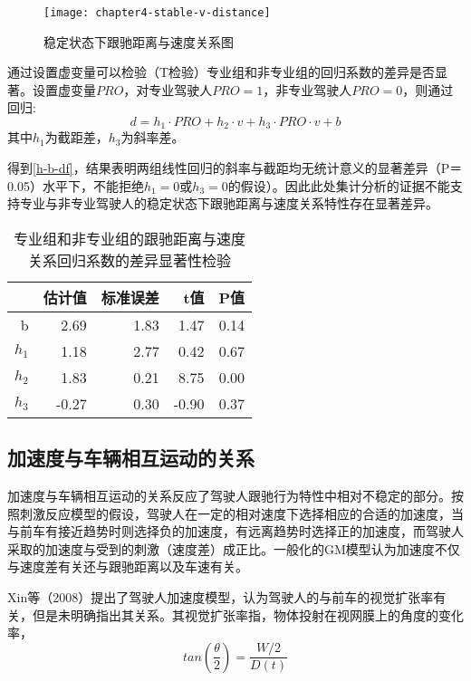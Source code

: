 \begin{figure}[htbp]
\begin{center}
\texttt{[image: chapter4-stable-v-distance]}
\end{center}
\caption{稳定状态下跟驰距离与速度关系图}
\label{stable-v-distance}
\end{figure}

通过设置虚变量可以检验（T检验）专业组和非专业组的回归系数的差异是否显著。设置虚变量$PRO$，对专业驾驶人$PRO=1$，非专业驾驶人$PRO=0$，则通过回归:
\begin{equation}
d=h_1 \cdot PRO+h_2\cdot v + h_3 \cdot PRO \cdot v +b
\end{equation}
其中$h_1$为截距差，$h_3$为斜率差。

得到\autoref{h-b-df}，结果表明两组线性回归的斜率与截距均无统计意义的显著差异（P＝0.05）水平下，不能拒绝$h_1=0$或$h_3=0$的假设）。因此此处集计分析的证据不能支持专业与非专业驾驶人的稳定状态下跟驰距离与速度关系特性存在显著差异。

\begin{table}[htbp]
\begin{center}
\caption{专业组和非专业组的跟驰距离与速度关系回归系数的差异显著性检验}
\begin{tabular}{rrrrr}
  \addlinespace
  \toprule
 & 估计值 & 标准误差 & t值 & P值 \\ 
  \midrule
b & 2.69 & 1.83 & 1.47 & 0.14 \\ 
  $h_1$ & 1.18 & 2.77 & 0.42 & 0.67 \\ 
  $h_2$ & 1.83 & 0.21 & 8.75 & 0.00 \\ 
  $h_3$ & -0.27 & 0.30 & -0.90 & 0.37 \\ 
   \bottomrule
\end{tabular}
\label{h-b-df}
\end{center}
\end{table}


\subsection{加速度与车辆相互运动的关系}
\label{ttc}
加速度与车辆相互运动的关系反应了驾驶人跟驰行为特性中相对不稳定的部分。按照刺激反应模型的假设，驾驶人在一定的相对速度下选择相应的合适的加速度，当与前车有接近趋势时则选择负的加速度，有远离趋势时选择正的加速度，而驾驶人采取的加速度与受到的刺激（速度差）成正比。一般化的GM模型认为加速度不仅与速度差有关还与跟驰距离以及车速有关。


Xin等（2008）\cite{Xin2008}提出了驾驶人加速度模型，认为驾驶人的与前车的视觉扩张率有关，但是未明确指出其关系。其视觉扩张率指，物体投射在视网膜上的角度的变化率，
\begin{equation}
tan(\frac{\theta}{2})=\frac{W/2}{D(t)}
\end{equation}

